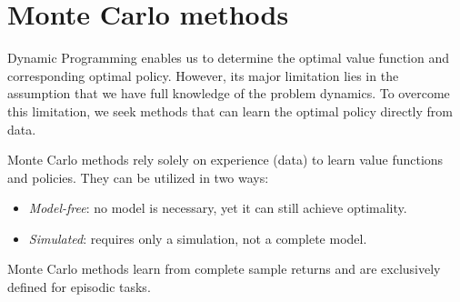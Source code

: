 \section{Monte Carlo methods}

Dynamic Programming enables us to determine the optimal value function and corresponding optimal policy. 
However, its major limitation lies in the assumption that we have full knowledge of the problem dynamics. 
To overcome this limitation, we seek methods that can learn the optimal policy directly from data.

Monte Carlo methods rely solely on experience (data) to learn value functions and policies.
They can be utilized in two ways:
\begin{itemize}
    \item \textit{Model-free}: no model is necessary, yet it can still achieve optimality.
    \item \textit{Simulated}: requires only a simulation, not a complete model.
\end{itemize}
Monte Carlo methods learn from complete sample returns and are exclusively defined for episodic tasks.

